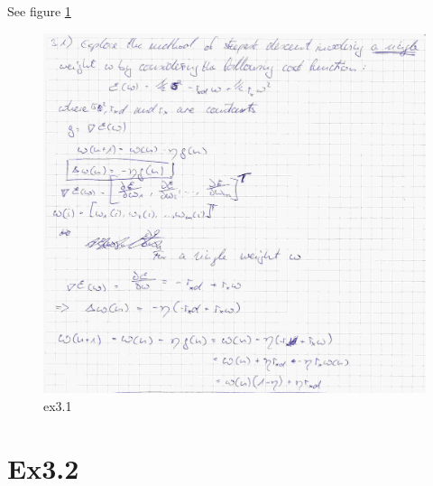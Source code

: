 \documentclass[paper=a4, fontsize=11pt]{scrartcl} %
\numberwithin{equation}{section} %
\numberwithin{figure}{section} %
\numberwithin{table}{section} %
\begin{document}
See figure \ref{fig3_1}
\begin{figure}[ht]
	\centering
  \includegraphics[width=0.7\textheight]{ex3_1.jpg}
	\caption{ex3.1}
	\label{fig3_1}
\end{figure}


\section{Ex3.2}
\end{document}
